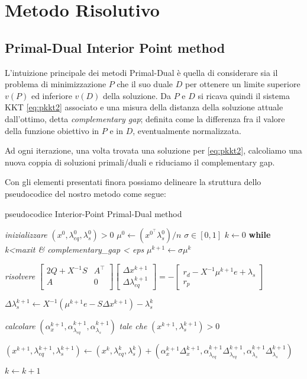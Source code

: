 \section{Metodo Risolutivo}
\subsection{Primal-Dual Interior Point method}
L'intuizione principale dei metodi Primal-Dual è 
quella di considerare sia il problema di minimizzazione
 $P$ che il suo duale $D$ per ottenere un limite 
superiore $v(P)$ ed inferiore $v(D)$ della soluzione.
Da $P$ e $D$ si ricava quindi il sistema KKT \ref{eq:pkkt2} associato e una misura
 della distanza della soluzione attuale dall'ottimo, detta \textit{complementary gap};
  definita come la differenza fra il valore della funzione obiettivo in $P$ e in $D$, eventualmente normalizzata.
  
  Ad ogni iterazione, una volta trovata una soluzione per \ref{eq:pkkt2}, calcoliamo una nuova coppia di soluzioni primali/duali 
  e riduciamo il complementary gap.

  Con gli elementi presentati finora possiamo delineare la struttura dello pseudocodice del nostro metodo come segue:

\begin{algorithm}
\caption{pseudocodice Interior-Point Primal-Dual method}\label{alg:pseudo}
\begin{algorithmic}[1]
\State \textit{inizializzare} $(x^0, \lambda_{eq}^0, \lambda_s^0) > 0$ 
\State $\mu^0 \gets (x^0^\intercal \lambda_s^0)/n$
\State $\sigma \in [0,1]$
\State $k \gets 0$
\BState \textbf{while} \emph{k<maxit \& complementary\_gap < eps}
\State $\mu^{k+1} \gets \sigma \mu^{k}  $

\State \textit{risolvere} \;$
\begin{bmatrix}
2Q +X^{-1}S & A^\intercal\\
A & 0 \\
\end{bmatrix}\begin{bmatrix}\Delta x^{k+1} \\ \Delta \lambda_{eq}^{k+1}\end{bmatrix}= -
\begin{bmatrix}
    r_d-X^{-1}\mu^{k+1} e + \lambda_s\\r_p
\end{bmatrix}
$

\State $\Delta \lambda_s^{k+1} \gets X^{-1}(\mu^{k+1} e - S\Delta x^{k+1}) - \lambda_s^{k}$ 

\State \textit{calcolare} \; $(\alpha_x^{k+1}, \alpha_{\lambda_{eq}}^{k+1}, \alpha_{\lambda_{s}}^{k+1})$ 
\textit{tale che} $(x^{k+1},\lambda_{s}^{k+1})>0$


\State $(x^{k+1}, \lambda_{eq}^{k+1}, \lambda_{s}^{k+1}) \gets
(x^{k}, \lambda_{eq}^{k}, \lambda_{s}^{k}) + 
(\alpha_x^{k+1}\Delta_x^{k+1}, \alpha_{\lambda_{eq}}^{k+1}\Delta_{\lambda_{eq}}^{k+1}, \alpha_{\lambda_{s}}^{k+1}\Delta_{\lambda_{s}}^{k+1})$

\State $k \gets k + 1$
\EndFunction
\end{algorithmic}
\end{algorithm}

